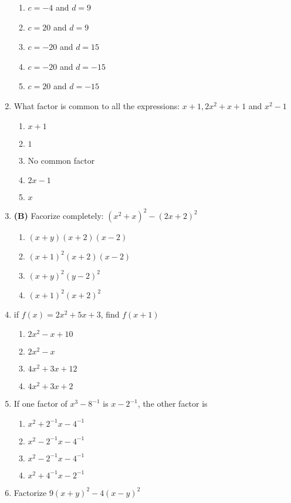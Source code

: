 \begin{multicols}{2}
\begin{enumerate}[label={\arabic*.}]
	\begin{enumerate}[label={\Alph*.}]
	\item \(c=-4\) and \(d=9\)
	\item \(c=20\) and \(d =9\)
	\item \(c=-20\) and \(d=15\)
	\item \(c=-20\) and \(d=-15\)
	\item \(c=20\) and \(d=-15\)
	\end{enumerate}
\item What factor is common to all the expressions: \(x+1, 2{x}^{2}+x+1\) and \({x}^{2}-1\)
	\begin{enumerate}[label={\Alph*.}]
	\item \(x+1\)
	\item \(1\)
	\item No common factor
	\item \(2x-1\)
	\item \(x\)
	\end{enumerate}
\item \textbf{(B)} Facorize completely: \(({x}^{2}+x)^2-(2x+2)^2\)
	\begin{enumerate}[label={\Alph*.}]
	\item \((x+y)(x+2)(x-2)\)
	\item \((x+1)^2(x+2)(x-2)\)
	\item \((x+y)^2(y-2)^2\)
	\item \((x+1)^2(x+2)^2\)
	\end{enumerate}
\item if \(f(x) = 2{x}^{2}+5x+3\), find \(f(x+1)\)
	\begin{enumerate}[label={\Alph*.}]
	\item \(2{x}^{2}-x+10\)
	\item \(2{x}^{2}-x\)
	\item \(4{x}^{2}+3x+12\)
	\item \(4{x}^{2}+3x+2\)
	\end{enumerate}
\item If one factor of \({x}^{3}-8^{-1}\) is \(x-2^{-1}\), the other factor is
	\begin{enumerate}[label={\Alph*.}]
	\item \({x}^{2}+2^{-1}x-4^{-1}\)
	\item \({x}^{2}-2^{-1}x-4^{-1}\)
	\item \({x}^{2}-2^{-1}x-4^{-1}\)
	\item \({x}^{2}+4^{-1}x-2^{-1}\)
	\end{enumerate}
\item Factorize \(9(x+y)^2 - 4(x-y)^2\)

\end{enumerate}
\end{multicols}
